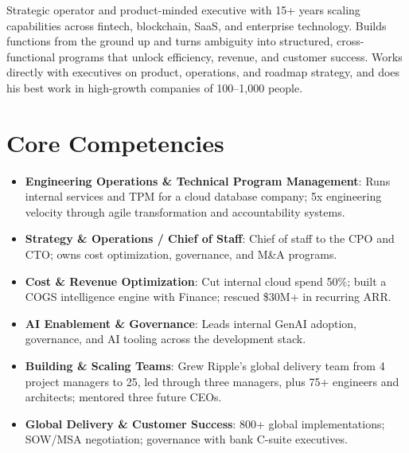 \documentclass[11pt,letterpaper,sans]{moderncv}
\begin{document}
\makecvtitle


\vspace{6pt}
\small{Strategic operator and product-minded executive with 15+ years scaling capabilities across fintech, blockchain, SaaS, and enterprise technology. Builds functions from the ground up and turns ambiguity into structured, cross-functional programs that unlock efficiency, revenue, and customer success. Works directly with executives on product, operations, and roadmap strategy, and does his best work in high-growth companies of 100--1,000 people.}


\section{Core Competencies}
\vspace{1pt}
\begin{itemize}

\item \textbf{Engineering Operations \& Technical Program Management}: Runs internal services and TPM for a cloud database company; 5x engineering velocity through agile transformation and accountability systems.

\item \textbf{Strategy \& Operations / Chief of Staff}: Chief of staff to the CPO and CTO; owns cost optimization, governance, and M\&A programs.

\item \textbf{Cost \& Revenue Optimization}: Cut internal cloud spend 50\%; built a COGS intelligence engine with Finance; rescued \$30M+ in recurring ARR.

\item \textbf{AI Enablement \& Governance}: Leads internal GenAI adoption, governance, and AI tooling across the development stack.

\item \textbf{Building \& Scaling Teams}: Grew Ripple's global delivery team from 4 project managers to 25, led through three managers, plus 75+ engineers and architects; mentored three future CEOs.

\item \textbf{Global Delivery \& Customer Success}: 800+ global implementations; SOW/MSA negotiation; governance with bank C-suite executives.

\end{itemize}
\end{document}
